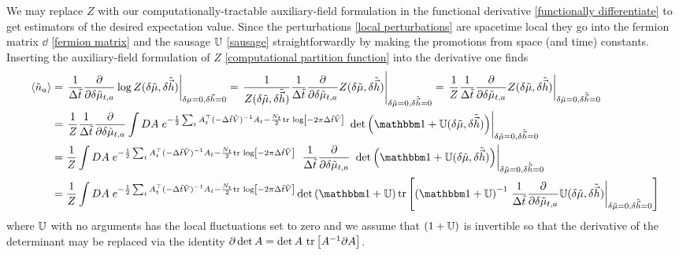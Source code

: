 We may replace $Z$ with our computationally-tractable auxiliary-field formulation in the functional derivative \eqref{functionally differentiate} to get estimators of the desired expectation value.
Since the perturbations \eqref{local perturbations} are spacetime local they go into the fermion matrix $\dd$ \eqref{fermion matrix} and the sausage $\mathbb{U}$ \eqref{sausage} straightforwardly by making the promotions from space (and time) constants.
Inserting the auxiliary-field formulation of $Z$ \eqref{computational partition function} into the derivative one finds
\begin{align}
	\expectation{\tilde{n}_a} &= \left.\oneover{\Delta\tilde{t}} \frac{\partial}{\partial \delta\tilde{\mu}_{t,a}} \log Z(\delta\tilde{\mu}, \delta\tilde{\vec{h}})\right|_{\delta\mu=0, \delta\vec{h}=0}
	=
	\left.\oneover{Z(\delta\tilde{\mu}, \delta\tilde{\vec{h}})} \oneover{\Delta\tilde{t}} \frac{\partial}{\partial \delta\tilde{\mu}_{t,a}} Z(\delta\tilde{\mu}, \delta\tilde{\vec{h}})\right|_{\delta\tilde{\mu}=0, \delta\tilde{\vec{h}}=0}
	=
	\left.\oneover{Z} \oneover{\Delta\tilde{t}} \frac{\partial}{\partial \delta\tilde{\mu}_{t,a}} Z(\delta\tilde{\mu}, \delta\tilde{\vec{h}})\right|_{\delta\tilde{\mu}=0, \delta\tilde{\vec{h}}=0}
	\nonumber\\
	&=
	\left.\oneover{Z} \oneover{\Delta\tilde{t}} \frac{\partial}{\partial \delta\tilde{\mu}_{t,a}}
		\int DA\; e^{-\frac{1}{2} \sum_t A\transpose_t (-\Delta\tilde{t} \tilde{V})\inverse A_t - \frac{N_t}{2} \trlog{ -2\pi \Delta\tilde{t}\tilde{V} }}
	~	\det \left(\one + \UU(\delta\tilde{\mu}, \delta\tilde{\vec{h}}) \right)
	\right|_{\delta\tilde{\mu}=0, \delta\tilde{\vec{h}}=0}
	\nonumber\\
	&=
	\oneover{Z}
		\int DA\; e^{-\frac{1}{2} \sum_t A\transpose_t (-\Delta\tilde{t} \tilde{V})\inverse A_t - \frac{N_t}{2} \trlog{ -2\pi \Delta\tilde{t}\tilde{V} }}
	~	\left.\oneover{\Delta\tilde{t}} \frac{\partial}{\partial \delta\tilde{\mu}_{t,a}}
	~	\det \left(\one + \UU(\delta\tilde{\mu}, \delta\tilde{\vec{h}}) \right)\right|_{\delta\tilde{\mu}=0, \delta\tilde{\vec{h}}=0}
	\nonumber\\
	&=
	\oneover{Z}
		\int DA\; e^{-\frac{1}{2} \sum_t A\transpose_t (-\Delta\tilde{t} \tilde{V})\inverse A_t - \frac{N_t}{2} \trlog{ -2\pi \Delta\tilde{t}\tilde{V} }}
		\det \left(\one + \UU \right) \tr{\left(\one + \UU \right)\inverse \left.\oneover{\Delta\tilde{t}} \frac{\partial}{\partial \delta\tilde{\mu}_{t,a}} \UU(\delta\tilde{\mu}, \delta\tilde{\vec{h}})\right|_{\delta\tilde{\mu}=0, \delta\tilde{\vec{h}}=0}}
	\label{eq:fermionic particle number}
\end{align}
where $\mathbb{U}$ with no arguments has the local fluctuations set to zero and we assume that $(1+\mathbb{U})$ is invertible so that the derivative of the determinant may be replaced via the identity $\partial \det{A} = \det A ~ \text{tr}\left[ A^{-1} \partial A\right]$.

